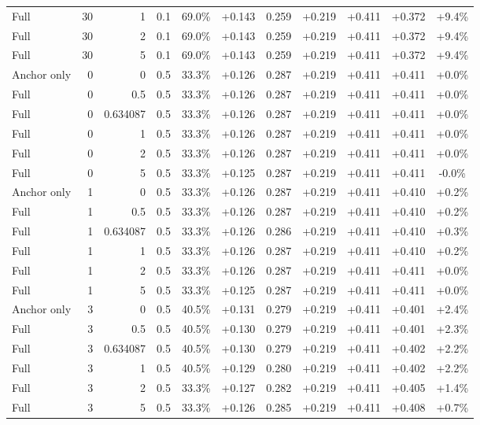 \begin{table}[htbp]
\begin{tabular}{lrrrccccccc}
Full & 30 & 1 & 0.1 & 69.0\% & +0.143 & 0.259 & +0.219 & +0.411 & +0.372 & +9.4\% \\
Full & 30 & 2 & 0.1 & 69.0\% & +0.143 & 0.259 & +0.219 & +0.411 & +0.372 & +9.4\% \\
Full & 30 & 5 & 0.1 & 69.0\% & +0.143 & 0.259 & +0.219 & +0.411 & +0.372 & +9.4\% \\
Anchor only & 0 & 0 & 0.5 & 33.3\% & +0.126 & 0.287 & +0.219 & +0.411 & +0.411 & +0.0\% \\
Full & 0 & 0.5 & 0.5 & 33.3\% & +0.126 & 0.287 & +0.219 & +0.411 & +0.411 & +0.0\% \\
Full & 0 & 0.634087 & 0.5 & 33.3\% & +0.126 & 0.287 & +0.219 & +0.411 & +0.411 & +0.0\% \\
Full & 0 & 1 & 0.5 & 33.3\% & +0.126 & 0.287 & +0.219 & +0.411 & +0.411 & +0.0\% \\
Full & 0 & 2 & 0.5 & 33.3\% & +0.126 & 0.287 & +0.219 & +0.411 & +0.411 & +0.0\% \\
Full & 0 & 5 & 0.5 & 33.3\% & +0.125 & 0.287 & +0.219 & +0.411 & +0.411 & -0.0\% \\
Anchor only & 1 & 0 & 0.5 & 33.3\% & +0.126 & 0.287 & +0.219 & +0.411 & +0.410 & +0.2\% \\
Full & 1 & 0.5 & 0.5 & 33.3\% & +0.126 & 0.287 & +0.219 & +0.411 & +0.410 & +0.2\% \\
Full & 1 & 0.634087 & 0.5 & 33.3\% & +0.126 & 0.286 & +0.219 & +0.411 & +0.410 & +0.3\% \\
Full & 1 & 1 & 0.5 & 33.3\% & +0.126 & 0.287 & +0.219 & +0.411 & +0.410 & +0.2\% \\
Full & 1 & 2 & 0.5 & 33.3\% & +0.126 & 0.287 & +0.219 & +0.411 & +0.411 & +0.0\% \\
Full & 1 & 5 & 0.5 & 33.3\% & +0.125 & 0.287 & +0.219 & +0.411 & +0.411 & +0.0\% \\
Anchor only & 3 & 0 & 0.5 & 40.5\% & +0.131 & 0.279 & +0.219 & +0.411 & +0.401 & +2.4\% \\
Full & 3 & 0.5 & 0.5 & 40.5\% & +0.130 & 0.279 & +0.219 & +0.411 & +0.401 & +2.3\% \\
Full & 3 & 0.634087 & 0.5 & 40.5\% & +0.130 & 0.279 & +0.219 & +0.411 & +0.402 & +2.2\% \\
Full & 3 & 1 & 0.5 & 40.5\% & +0.129 & 0.280 & +0.219 & +0.411 & +0.402 & +2.2\% \\
Full & 3 & 2 & 0.5 & 33.3\% & +0.127 & 0.282 & +0.219 & +0.411 & +0.405 & +1.4\% \\
Full & 3 & 5 & 0.5 & 33.3\% & +0.126 & 0.285 & +0.219 & +0.411 & +0.408 & +0.7\% \\

\end{tabular}
\end{table}
